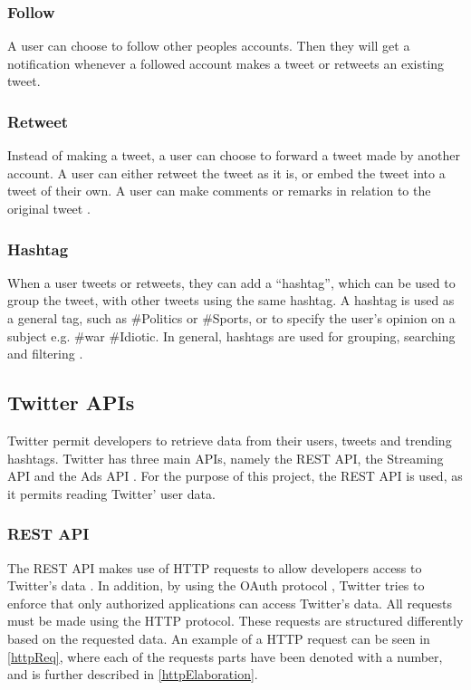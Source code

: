 \subsubsection{Follow}
A user can choose to follow other peoples accounts. Then they will get a
notification whenever a followed account makes a tweet or retweets an existing
tweet.

\subsubsection{Retweet}
Instead of making a tweet, a user can choose to forward a tweet made by another
account. A user can either retweet the tweet as it is, or embed the tweet into a
tweet of their own. A user can make comments or remarks in relation to the
original tweet .

\subsubsection{Hashtag}
When a user tweets or retweets, they can add a ``hashtag'', which can be used to
group the tweet, with other tweets using the same hashtag. A hashtag is used as
a general tag, such as \#Politics or \#Sports, or to specify the user's
opinion on a subject e.g. \#war \#Idiotic. In general, hashtags are used for
grouping, searching and filtering  .

\subsection{Twitter \acp{API}} \label{sub:twitterapi}
Twitter permit developers to retrieve data from their users, tweets and
trending hashtags. Twitter has three main \acp{API}, namely the \ac{REST} \ac{API}, the Streaming
\ac{API} and the Ads \ac{API} \citep{TwitterDevDocs}. For the purpose of this
project, the \ac{REST} \ac{API} is used, as it permits reading Twitter' user
data.

\subsubsection{REST API}
The \ac{REST} \ac{API} makes use of \ac{HTTP} requests to allow developers
access to Twitter's data \citep{TwitterREST}. In addition, by using the OAuth protocol
\citep{TwitterOAuth}, Twitter tries to enforce that only authorized applications
can access Twitter's data. All requests must be made using the
\ac{HTTP} protocol. These requests are structured differently based on the
requested data. An example of a \ac{HTTP} request can be seen in
\autoref{httpReq}, where each of the requests parts have been denoted with a
number, and is further described in \autoref{httpElaboration}.

